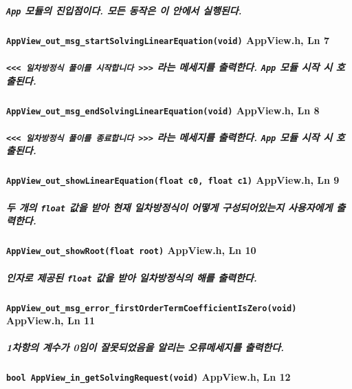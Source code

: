 \documentclass{article}
\begin{document}
    \subparagraph{\normalfont\texttt{App} 모듈의 진입점이다. 모든 동작은 이 안에서 실행된다.}
    
    \paragraph{\large\texttt{AppView\_out\_msg\_startSolvingLinearEquation(void)} \tiny AppView.h, Ln 7}

    \subparagraph{\normalfont\texttt{<<< 일차방정식 풀이를 시작합니다 >>>} 라는 메세지를 출력한다. \texttt{App} 모듈 시작 시 호출된다.}

    \paragraph{\large\texttt{AppView\_out\_msg\_endSolvingLinearEquation(void)} \tiny AppView.h, Ln 8}

    \subparagraph{\normalfont\texttt{<<< 일차방정식 풀이를 종료합니다 >>>} 라는 메세지를 출력한다. \texttt{App} 모듈 시작 시 호출된다.}

    \paragraph{\large\texttt{AppView\_out\_showLinearEquation(float c0, float c1)} \tiny AppView.h, Ln 9}
    
    \subparagraph{\normalfont 두 개의 \texttt{float} 값을 받아 현재 일차방정식이 어떻게 구성되어있는지 사용자에게 출력한다.}

    \paragraph{\large\texttt{AppView\_out\_showRoot(float root)} \tiny AppView.h, Ln 10}

    \subparagraph{\normalfont 인자로 제공된 \texttt{float} 값을 받아 일차방정식의 해를 출력한다.}

    \paragraph{\large\texttt{AppView\_out\_msg\_error\_firstOrderTermCoefficientIsZero(void)} \tiny AppView.h, Ln 11}

    \subparagraph{\normalfont 1차항의 계수가 0임이 잘못되었음을 알리는 오류메세지를 출력한다.}

    \paragraph{\large\texttt{bool AppView\_in\_getSolvingRequest(void)} \tiny AppView.h, Ln 12}
\end{document}

